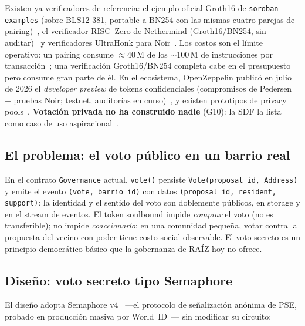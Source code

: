 \documentclass[twocolumn,10pt]{article}
\begin{document}
Existen ya verificadores de referencia: el ejemplo oficial Groth16 de \texttt{soroban-examples} (sobre BLS12-381, portable a BN254 con las mismas cuatro parejas de pairing)~\cite{groth16ej}, el verificador RISC~Zero de Nethermind (Groth16/BN254, sin auditar)~\cite{risc0ver} y verificadores UltraHonk para Noir~\cite{ultrahonk}. Los costos son el l\'imite operativo: un pairing consume $\approx$40\,M de los $\sim$100\,M de instrucciones por transacci\'on~\cite{privpools,noirdisc}; una verificaci\'on Groth16/BN254 completa cabe en el presupuesto pero consume gran parte de \'el. En el ecosistema, OpenZeppelin public\'o en julio de 2026 el \emph{developer preview} de tokens confidenciales (compromisos de Pedersen + pruebas Noir; testnet, auditor\'ias en curso)~\cite{conftok}, y existen prototipos de privacy pools~\cite{privpools}. \textbf{Votaci\'on privada no ha construido nadie} (G10): la SDF la lista como caso de uso aspiracional~\cite{zk5}.

\subsection{El problema: el voto p\'ublico en un barrio real}

En el contrato \texttt{Governance} actual, \texttt{vote()} persiste \texttt{Vote(proposal\_id, Address)} y emite el evento \texttt{(vote, barrio\_id)} con datos \texttt{(proposal\_id, resident, support)}: la identidad y el sentido del voto son doblemente p\'ublicos, en storage y en el stream de eventos. El token soulbound impide \emph{comprar} el voto (no es transferible); no impide \emph{coaccionarlo}: en una comunidad peque\~na, votar contra la propuesta del vecino con poder tiene costo social observable. El voto secreto es un principio democr\'atico b\'asico que la gobernanza de RA\'IZ hoy no ofrece.

\subsection{Dise\~no: voto secreto tipo Semaphore}

El dise\~no adopta Semaphore v4~\cite{semaphore} ---el protocolo de se\~nalizaci\'on an\'onima de PSE, probado en producci\'on masiva por World~ID~\cite{worldid}--- sin modificar su circuito:
\end{document}

